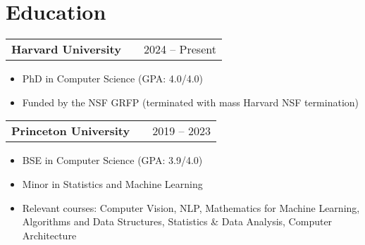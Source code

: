 \documentclass[a4paper,12pt]{article}
\makeatletter
\newenvironment{joblong}[2]
    {
    \begin{tabularx}{\linewidth}{@{}l X r@{}}
    \textbf{#1} & \hfill &  #2 \\[3.75pt]
    \end{tabularx}
    \begin{minipage}[t]{\linewidth}
    \begin{itemize}[nosep,after=\strut, leftmargin=2em, itemsep=3pt,label=--]
    }
    {
    \end{itemize}
    \end{minipage}    
    }
\makeatother
\begin{document}
\section{Education}
\begin{adjustwidth}{0.7em}{0pt}

\begin{joblong}{Harvard University}{2024 – Present}
\item PhD in Computer Science (GPA: 4.0/4.0)
\item Funded by the NSF GRFP (terminated with mass Harvard NSF termination)
\end{joblong}

\vspace{-3pt}
\begin{joblong}{Princeton University}{2019 – 2023}
\item BSE in Computer Science (GPA: 3.9/4.0)
\item Minor in Statistics and Machine Learning
\item Relevant courses: Computer Vision, NLP, Mathematics for Machine Learning, \newline Algorithms and Data Structures, Statistics \& Data Analysis, Computer Architecture
\end{joblong}




\end{adjustwidth}
\end{document}

